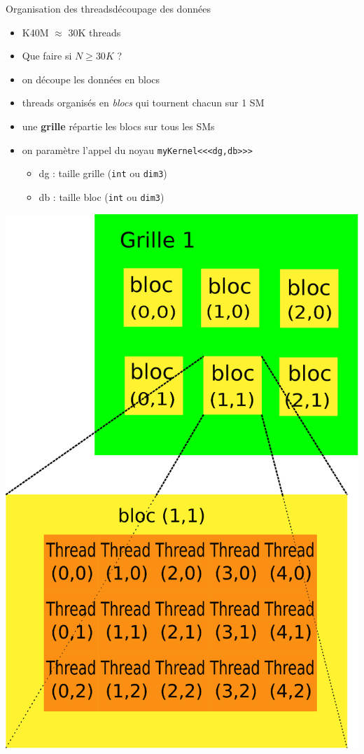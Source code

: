 \documentclass[11pt,mathserif]{beamer}
\newcommand{\scout}{\faAngellist}
\newcommand{\galde}{\faQuestion}
\newcommand{\argi}{\faLightbulbO}
\begin{document}
\begin{frame}{Organisation des threads}{découpage des données}
 \pause
 \begin{minipage}[c]{0.59\linewidth}
  \begin{itemize}[<+->]
    \item[\argi] K40M $\approx$ 30K threads 
    \item[\galde] Que faire si $N \geq 30K$ ?
    \item[\scout] on découpe les données en blocs
    \item[\argi] threads organisés en {\em blocs} qui tournent chacun sur 1 SM
    \item[\argi] une {\bf grille} répartie les blocs sur tous les SMs
    \item[\argi] on paramètre l'appel du noyau \texttt{myKernel<<<dg,db>>>} 
      \begin{itemize}
        \item dg : taille grille (\texttt{int} ou \texttt{dim3})
        \item db : taille bloc (\texttt{int} ou \texttt{dim3})
      \end{itemize}
  \end{itemize}
\end{minipage}
\begin{minipage}[c]{0.39\linewidth}
\begin{center}
  \includegraphics[width=0.8\linewidth]{fig/grille_et_blocs.eps}
\end{center}
\end{minipage}
\end{frame}
\end{document}
